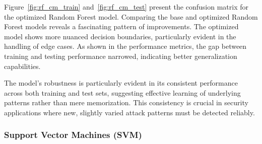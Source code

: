 \begin{itemize}
                    \vspace{0.3em}
                    
                    Figure~\ref{fig:rf_cm_train} and~\ref{fig:rf_cm_test} present the confusion matrix for the optimized Random Forest model. Comparing the base and optimized Random Forest models reveals a fascinating pattern of improvements. The optimized model shows more nuanced decision boundaries, particularly evident in the handling of edge cases. As shown in the performance metrics, the gap between training and testing performance narrowed, indicating better generalization capabilities.
            
                    The model's robustness is particularly evident in its consistent performance across both training and test sets, suggesting effective learning of underlying patterns rather than mere memorization. This consistency is crucial in security applications where new, slightly varied attack patterns must be detected reliably.
                    
                
            \end{itemize}

        \subsubsection{Support Vector Machines (SVM)}
        

